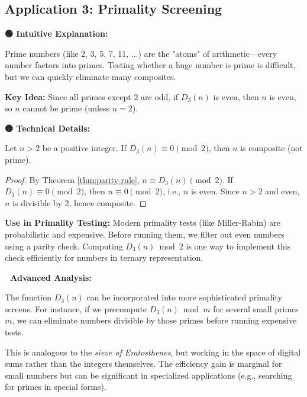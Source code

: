 \subsection{Application 3: Primality Screening}

\textbf{🟢 Intuitive Explanation:}

Prime numbers (like 2, 3, 5, 7, 11, ...) are the "atoms" of arithmetic—every number factors into primes. Testing whether a huge number is prime is difficult, but we can quickly eliminate many composites.

\textbf{Key Idea:} Since all primes except 2 are odd, if $D_3(n)$ is even, then $n$ is even, so $n$ cannot be prime (unless $n = 2$).

\textbf{🟡 Technical Details:}

\begin{proposition}
\label{prop:parity-filter}
Let $n > 2$ be a positive integer. If $D_3(n) \equiv 0 \pmod{2}$, then $n$ is composite (not prime).
\end{proposition}

\begin{proof}
By Theorem \ref{thm:parity-rule}, $n \equiv D_3(n) \pmod{2}$. If $D_3(n) \equiv 0 \pmod{2}$, then $n \equiv 0 \pmod{2}$, i.e., $n$ is even. Since $n > 2$ and even, $n$ is divisible by 2, hence composite.
\end{proof}

\textbf{Use in Primality Testing:} Modern primality tests (like Miller-Rabin) are probabilistic and expensive. Before running them, we filter out even numbers using a parity check. Computing $D_3(n) \bmod 2$ is one way to implement this check efficiently for numbers in ternary representation.

\textbf{🔴 Advanced Analysis:}

The function $D_3(n)$ can be incorporated into more sophisticated primality screens. For instance, if we precompute $D_3(n) \bmod m$ for several small primes $m$, we can eliminate numbers divisible by those primes before running expensive tests.

This is analogous to the \textit{sieve of Eratosthenes}, but working in the space of digital sums rather than the integers themselves. The efficiency gain is marginal for small numbers but can be significant in specialized applications (e.g., searching for primes in special forms).


